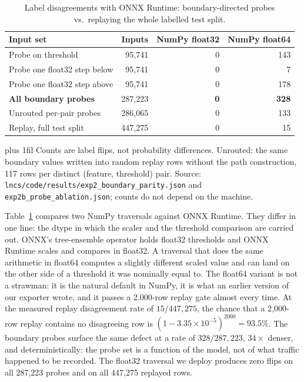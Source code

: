 \documentclass[runningheads]{llncs}
\newcommand{\tabnote}[1]{%
  \vspace{4pt}\par\noindent
  \begin{minipage}{\textwidth}%
    \footnotesize\parindent=0pt\leftskip=0pt\rightskip=0pt\parfillskip=0pt plus 1fil\relax
    #1%
  \end{minipage}}
\begin{document}
\begin{table}[htbp]
  \caption{Label disagreements with ONNX Runtime: boundary-directed probes vs.\ replaying the whole labelled test split.}
  \label{tab:boundary}
  \centering
  \small
  \begin{tabular}{l r r r}
    \toprule
    Input set & Inputs & NumPy float32 & NumPy float64 \\
    \midrule
    Probe on threshold          & 95{,}741  & 0 & 143 \\
    Probe one float32 step below & 95{,}741  & 0 & 7 \\
    Probe one float32 step above & 95{,}741  & 0 & 178 \\
    \textbf{All boundary probes} & 287{,}223 & \textbf{0} & \textbf{328} \\
    \midrule
    Unrouted per-pair probes     & 286{,}065 & 0 & 133 \\
    Replay, full test split      & 447{,}275 & 0 & 15 \\
    \bottomrule
  \end{tabular}
  \tabnote{Counts are label flips, not probability differences. Unrouted: the same boundary values written into random replay rows without the path construction, 117 rows per distinct (feature, threshold) pair. Source: \texttt{lncs/code/results/exp2\_boundary\_parity.json} and \texttt{exp2b\_probe\_ablation.json}; counts do not depend on the machine.}
\end{table}

Table~\ref{tab:boundary} compares two NumPy traversals against ONNX Runtime. They differ in one line: the dtype in which the scaler and the threshold comparison are carried out. ONNX's tree-ensemble operator holds float32 thresholds and ONNX Runtime scales and compares in float32. A traversal that does the same arithmetic in float64 computes a slightly different scaled value and can land on the other side of a threshold it was nominally equal to. The float64 variant is not a strawman: it is the natural default in NumPy, it is what an earlier version of our exporter wrote, and it passes a 2{,}000-row replay gate almost every time. At the measured replay disagreement rate of $15/447{,}275$, the chance that a 2{,}000-row replay contains no disagreeing row is $(1 - 3.35\times10^{-5})^{2000} = 93.5\%$. The boundary probes surface the same defect at a rate of $328/287{,}223$, $34\times$ denser, and deterministically: the probe set is a function of the model, not of what traffic happened to be recorded. The float32 traversal we deploy produces zero flips on all 287{,}223 probes and on all 447{,}275 replayed rows.
\end{document}
